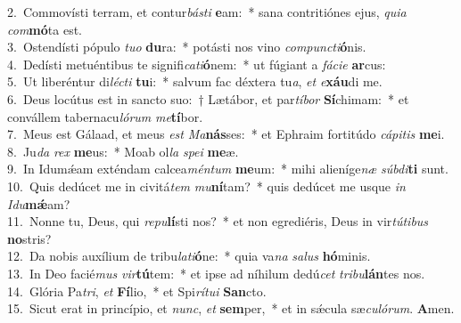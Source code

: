 {2.~}Commovísti terram, et contur\textit{bá}\textit{sti} \textbf{e}am:~* sana contritiónes ejus, \textit{qui}\textit{a} \textit{com}\textbf{mó}ta est.\\
{3.~}Ostendísti pópulo \textit{tu}\textit{o} \textbf{du}ra:~* potásti nos vino \textit{com}\textit{pun}\textit{cti}\textbf{ó}nis.\\
{4.~}Dedísti metuéntibus te signifi\textit{ca}\textit{ti}\textbf{ó}nem:~* ut fúgiant a \textit{fá}\textit{ci}\textit{e} \textbf{ar}cus:\\
{5.~}Ut liberéntur di\textit{lé}\textit{cti} \textbf{tu}i:~* salvum fac déxtera tu\textit{a}, \textit{et} \textit{e}\textbf{xáu}di me.\\
{6.~}Deus locútus est in sancto suo:~† Lætábor, et par\textit{tí}\textit{bor} \textbf{Sí}chimam:~* et convállem tabernacu\textit{ló}\textit{rum} \textit{me}\textbf{tí}bor.\\
{7.~}Meus est Gálaad, et meus \textit{est} \textit{Ma}\textbf{nás}ses:~* et Ephraim fortitúdo \textit{cá}\textit{pi}\textit{tis} \textbf{me}i.\\
{8.~}Ju\textit{da} \textit{rex} \textbf{me}us:~* Moab ol\textit{la} \textit{spe}\textit{i} \textbf{me}æ.\\
{9.~}In Idumǽam exténdam calcea\textit{mén}\textit{tum} \textbf{me}um:~* mihi alieníge\textit{næ} \textit{súb}\textit{di}\textbf{ti} sunt.\\
{10.~}Quis dedúcet me in civitá\textit{tem} \textit{mu}\textbf{ní}tam?~* quis dedúcet me usque \textit{in} \textit{I}\textit{du}\textbf{mǽ}am?\\
{11.~}Nonne tu, Deus, qui \textit{re}\textit{pu}\textbf{lí}sti nos?~* et non egrediéris, Deus in vir\textit{tú}\textit{ti}\textit{bus} \textbf{no}stris?\\
{12.~}Da nobis auxílium de tribu\textit{la}\textit{ti}\textbf{ó}ne:~* quia va\textit{na} \textit{sa}\textit{lus} \textbf{hó}minis.\\
{13.~}In Deo facié\textit{mus} \textit{vir}\textbf{tú}tem:~* et ipse ad níhilum dedú\textit{cet} \textit{tri}\textit{bu}\textbf{lán}tes nos.\\
{14.~}Glória Pa\textit{tri}, \textit{et} \textbf{Fí}lio,~* et Spi\textit{rí}\textit{tu}\textit{i} \textbf{San}cto.\\
{15.~}Sicut erat in princípio, et \textit{nunc}, \textit{et} \textbf{sem}per,~* et in sǽcula sæ\textit{cu}\textit{ló}\textit{rum}. \textbf{A}men.\\
